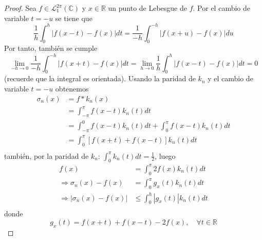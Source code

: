 \documentclass[12pt]{report}
\theoremstyle{largebreak}
\renewcommand{\leq}{\ensuremath{\leqslant}}
\newcommand\abs[1]{\ensuremath{\left|#1\right|}}
\begin{document}
    \begin{proof}
        Sea $f\in\mathcal{L}_1^{2\pi}(\mathbb{C})$ y $x\in\mathbb{R}$ un punto de Lebesgue de $f$. Por el cambio de variable $t=-u$ se tiene que
        \begin{equation*}
            \frac{1}{h}\int_0^h\abs{f(x-t)-f(x)}dt=\frac{1}{-h}\int_0^{-h}\abs{f(x+u)-f(x)}du
        \end{equation*}
        Por tanto, también se cumple
        \begin{equation*}
            \lim_{ -h\rightarrow0}\frac{1}{-h}\int_0^{-h}\abs{f(x+t)-f(x)}dt=\lim_{ h\rightarrow0}\frac{1}{h}\int_0^h\abs{f(x-t)-f(x)}dt=0
        \end{equation*}
        (recuerde que la integral es orientada). Usando la paridad de $k_n$ y el cambio de variable $t=-u$ obtenemos
        \begin{equation*}
            \begin{split}
                \sigma_n(x)&=f*k_n(x)\\
                &=\int_{-\pi}^{\pi}f(x-t)k_n(t)dt\\
                &=\int_{-\pi}^{0}f(x-t)k_n(t)dt+\int_{0}^{\pi}f(x-t)k_n(t)dt\\
                &=\int_{0}^{\pi}\left[f(x+t)+f(x-t)\right]k_n(t)dt\\
            \end{split}
        \end{equation*}
        también, por la paridad de $k_n$: $\int_{0}^{\pi}k_n(t)dt=\frac{1}{2}$, luego
        \begin{equation*}
            \begin{split}
                f(x)&=\int_0^{\pi}2f(x)k_n(t)dt\\
                \Rightarrow \sigma_n(x)-f(x)&=\int_0^{\pi}g_x(t)k_n(t)dt\\
                \Rightarrow \abs{\sigma_n(x)-f(x)}&\leq\int_0^h\abs{g_x(t)}k_n(t)dt\\
            \end{split}
        \end{equation*}
        donde
        \begin{equation*}
            g_x(t)=f(x+t)+f(x-t)-2f(x),\quad\forall t\in\mathbb{R}
        \end{equation*}
        

\end{proof}
\end{document}
